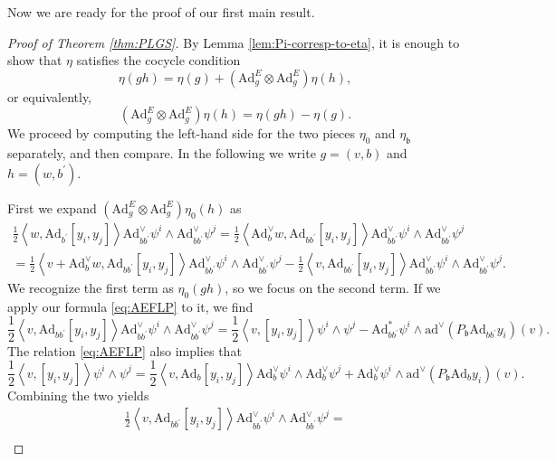 \documentclass[a4paper,11pt]{amsart}
\newcommand{\fr}[1]{\mathfrak{#1}}
\newcommand{\ox}{\otimes}
\newcommand{\pr}{\prime}
\newcommand{\Ad}{\mathrm{Ad}}
\newcommand{\ad}{\mathrm{ad}}
\theoremstyle{definition}
\theoremstyle{remark}
\begin{document}
Now we are ready for the proof of our first main result.

\begin{proof}[Proof of Theorem \ref{thm:PLGS}]
By Lemma \ref{lem:Pi-corresp-to-eta}, it is enough to show that $\eta$ satisfies the cocycle condition
\[
\eta(g h) = \eta(g) + \left( \Ad^{E}_g \ox \Ad^{E}_g \right) \eta(h),
\]
or equivalently,
\[
\left( \Ad^{E}_g \ox \Ad^{E}_g \right) \eta(h) = \eta(g h) - \eta(g) .
\]
We proceed by computing the left-hand side for the two pieces $\eta_0$ and $\eta_{\fr{b}}$ separately, and then compare.
In the following we write $g = (v, b)$ and $h = (w, b^\pr)$.

First we expand $\left( \Ad^{E}_g \ox \Ad^{E}_g \right) \eta_0(h)$ as
\begin{multline*}
\frac{1}{2} \left\langle w , \Ad_{b^\pr} \mathopen{}\left[ y_i , y_j \right] \right\rangle \Ad^\vee_{b b^\pr} \psi^i \wedge \Ad^\vee_{b b^\pr} \psi^j 
= \frac{1}{2} \left\langle \Ad^\vee_b w , \Ad_{b b^\pr} \mathopen{} \left[ y_i , y_j \right] \right\rangle \Ad^\vee_{b b^\pr} \psi^i \wedge \Ad^\vee_{b b^\pr} \psi^j \\
= \frac{1}{2} \left\langle v + \Ad^\vee_b w , \Ad_{b b^\pr} \mathopen{} \left[ y_i , y_j \right] \right\rangle \Ad^\vee_{b b^\pr} \psi^i \wedge \Ad^\vee_{b b^\pr} \psi^j - \frac{1}{2} \left\langle v , \Ad_{b b^\pr} \mathopen{} \left[ y_i , y_j \right] \right\rangle \Ad^\vee_{b b^\pr} \psi^i \wedge \Ad^\vee_{b b^\pr} \psi^j .
\end{multline*}
We recognize the first term as $\eta_0(g h)$, so we focus on the second term.
If we apply our formula \eqref{eq:AEFLP} to it, we find
\[
\frac{1}{2} \left\langle v , \Ad_{b b^\pr} \mathopen{} \left[ y_i , y_j \right] \right\rangle \Ad^\vee_{b b^\pr} \psi^i \wedge \Ad^\vee_{b b^\pr} \psi^j = \frac{1}{2} \left\langle v , \left[ y_i , y_j \right] \right\rangle \psi^i \wedge \psi^j - \Ad_{b b^\pr}^* \psi^i \wedge \ad^\vee ( P_{\fr{b}}\Ad_{b b^\pr} y_i ) (v).
\]
The relation \eqref{eq:AEFLP} also implies that
\[
\frac{1}{2} \left\langle v , \left[ y_i , y_j \right] \right\rangle \psi^i \wedge \psi^j = \frac{1}{2} \left\langle v , \Ad_b \mathopen{} \left[ y_i , y_j \right] \right\rangle \Ad^\vee_b \psi^i \wedge \Ad^\vee_b \psi^j + \Ad^\vee_b \psi^i \wedge \ad^\vee ( P_{\fr{b}} \Ad_b y_i ) (v) .
\]
Combining the two yields
\begin{multline*}
\frac{1}{2} \left\langle v , \Ad_{b b^\pr} \mathopen{} \left[ y_i , y_j \right] \right\rangle \Ad^\vee_{b b^\pr} \psi^i \wedge \Ad^\vee_{b b^\pr} \psi^j =\\

\end{multline*}
\end{proof}
\end{document}
